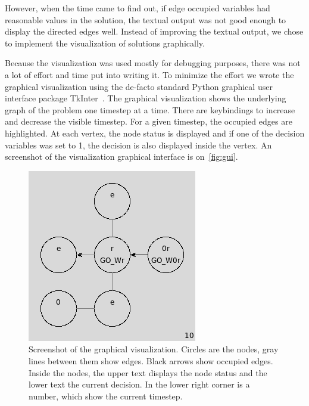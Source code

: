 However, when the time came to find out, if edge occupied variables had
reasonable values in the solution, the textual output was not good enough to
display the directed edges well. Instead of improving the textual output, we
chose to implement the visualization of solutions graphically.

Because the visualization was used mostly for debugging purposes, there was not
a lot of effort and time put into writing it. To minimize the effort we wrote
the graphical visualization using the de-facto standard Python graphical user
interface package TkInter~\cite{tkinter}. The graphical visualization shows the
underlying graph of the problem one timestep at a time. There are keybindings
to increase and decrease the visible timestep. For a given timestep, the
occupied edges are highlighted. At each vertex, the node status is displayed
and if one of the decision variables was set to 1, the decision is also displayed
inside the vertex. An screenshot of the visualization graphical interface is
on~\autoref{fig:gui}.

\begin{figure}[h]
    \begin{center}
	\includegraphics[scale=0.6]{fig/app/ex10.png}
        \caption{Screenshot of the graphical visualization. Circles are the
            nodes, gray lines between them show edges. Black arrows show
            occupied edges. Inside the nodes, the upper text displays the node
            status and the lower text the current decision. In the lower right
        corner is a number, which show the current timestep. }
        \label{fig:gui}
    \end{center}
\end{figure}

